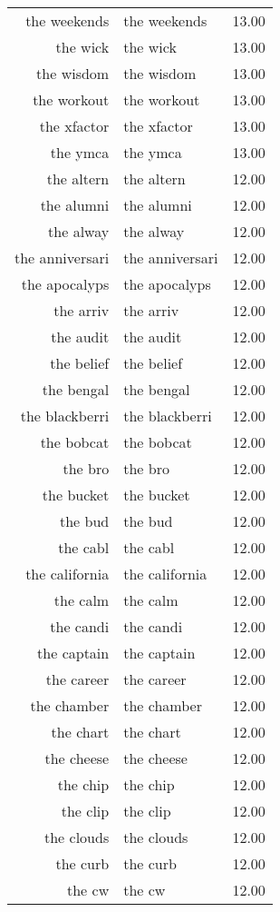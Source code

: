 \begin{table}[ht]
\begin{tabular}{rlr}
  the weekends & the weekends & 13.00 \\ 
  the wick & the wick & 13.00 \\ 
  the wisdom & the wisdom & 13.00 \\ 
  the workout & the workout & 13.00 \\ 
  the xfactor & the xfactor & 13.00 \\ 
  the ymca & the ymca & 13.00 \\ 
  the altern & the altern & 12.00 \\ 
  the alumni & the alumni & 12.00 \\ 
  the alway & the alway & 12.00 \\ 
  the anniversari & the anniversari & 12.00 \\ 
  the apocalyps & the apocalyps & 12.00 \\ 
  the arriv & the arriv & 12.00 \\ 
  the audit & the audit & 12.00 \\ 
  the belief & the belief & 12.00 \\ 
  the bengal & the bengal & 12.00 \\ 
  the blackberri & the blackberri & 12.00 \\ 
  the bobcat & the bobcat & 12.00 \\ 
  the bro & the bro & 12.00 \\ 
  the bucket & the bucket & 12.00 \\ 
  the bud & the bud & 12.00 \\ 
  the cabl & the cabl & 12.00 \\ 
  the california & the california & 12.00 \\ 
  the calm & the calm & 12.00 \\ 
  the candi & the candi & 12.00 \\ 
  the captain & the captain & 12.00 \\ 
  the career & the career & 12.00 \\ 
  the chamber & the chamber & 12.00 \\ 
  the chart & the chart & 12.00 \\ 
  the cheese & the cheese & 12.00 \\ 
  the chip & the chip & 12.00 \\ 
  the clip & the clip & 12.00 \\ 
  the clouds & the clouds & 12.00 \\ 
  the curb & the curb & 12.00 \\ 
  the cw & the cw & 12.00 \\ 

\end{tabular}
\end{table}
